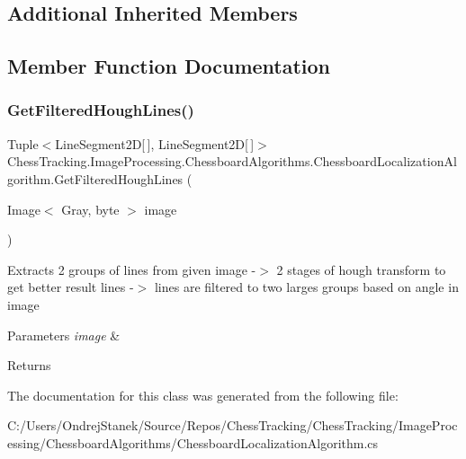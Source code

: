 \subsection*{Additional Inherited Members}


\subsection{Member Function Documentation}
\mbox{\label{class_chess_tracking_1_1_image_processing_1_1_chessboard_algorithms_1_1_chessboard_localization_algorithm_a9b732ea43a2ee35d0ae78678243057db}} 
\subsubsection{\texorpdfstring{GetFilteredHoughLines()}{GetFilteredHoughLines()}}
{\footnotesize\ttfamily Tuple$<$Line\+Segment2D\mbox{[}$\,$\mbox{]}, Line\+Segment2D\mbox{[}$\,$\mbox{]}$>$ Chess\+Tracking.\+Image\+Processing.\+Chessboard\+Algorithms.\+Chessboard\+Localization\+Algorithm.\+Get\+Filtered\+Hough\+Lines (\begin{DoxyParamCaption}\item[{Image$<$ Gray, byte $>$}]{image }\end{DoxyParamCaption})\hspace{0.3cm}{\ttfamily [private]}}



Extracts 2 groups of lines from given image -\/$>$ 2 stages of hough transform to get better result lines -\/$>$ lines are filtered to two larges groups based on angle in image 


\begin{DoxyParams}{Parameters}
{\em image} & \\
\hline
\end{DoxyParams}
\begin{DoxyReturn}{Returns}

\end{DoxyReturn}


The documentation for this class was generated from the following file\+:\begin{DoxyCompactItemize}
\item 
C\+:/\+Users/\+Ondrej\+Stanek/\+Source/\+Repos/\+Chess\+Tracking/\+Chess\+Tracking/\+Image\+Processing/\+Chessboard\+Algorithms/Chessboard\+Localization\+Algorithm.\+cs\end{DoxyCompactItemize}
